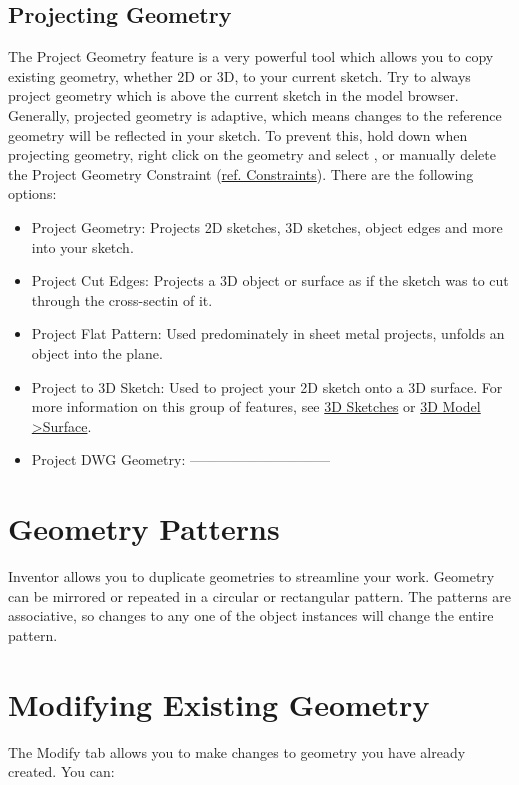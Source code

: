 \subsection{Projecting Geometry}
The Project Geometry feature is a very powerful tool which allows you to copy existing geometry, whether 2D or 3D, to your current sketch. Try to always project geometry which is above the current sketch in the model browser. Generally, projected geometry is adaptive, which means changes to the reference geometry will be reflected in your sketch. To prevent this, hold down  when projecting geometry, right click on the geometry and select , or manually delete the Project Geometry Constraint (\hyperref[chap:constraints]{ref. Constraints}). There are the following options:

\begin{itemize}
\item Project Geometry: Projects 2D sketches, 3D sketches, object edges and more into your sketch.
\item Project Cut Edges: Projects a 3D object or surface as if the sketch was to cut through the cross-sectin of it.
\item Project Flat Pattern: Used predominately in sheet metal projects, unfolds an object into the plane.
\item Project to 3D Sketch: Used to project your 2D sketch onto a 3D surface. For more information on this group of features, see \hyperref[section: 3D Sketches]{3D Sketches} or \hyperref[subsection: 3D Model Surface]{3D Model \textgreater Surface}.
\item Project DWG Geometry:  ------------------------------
\end{itemize}

\section{Geometry Patterns}
Inventor allows you to duplicate geometries to streamline your work. Geometry can be mirrored or repeated in a circular or rectangular pattern. The patterns are associative, so changes to any one of the object instances will change the entire pattern.

\section{Modifying Existing Geometry}
The Modify tab allows you to make changes to geometry you have already created. You can:

